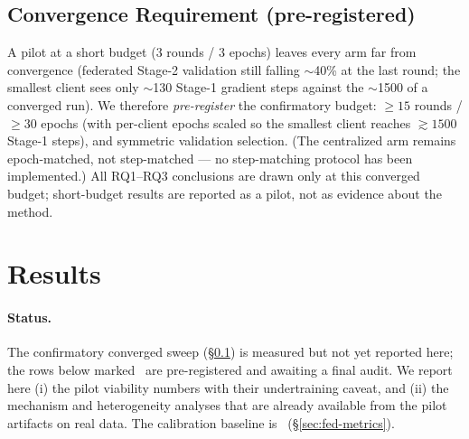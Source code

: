 \subsection{Convergence Requirement (pre-registered)}
\label{sec:fed-convergence}
A pilot at a short budget ($3$ rounds / $3$ epochs) leaves every arm far from convergence
(federated Stage-2 validation still falling $\sim$40\% at the last round; the smallest
client sees only $\sim$130 Stage-1 gradient steps against the $\sim$1500 of a converged
run). We therefore \emph{pre-register} the confirmatory budget: $\geq 15$ rounds /
$\geq 30$ epochs (with per-client epochs scaled so the smallest client reaches
$\gtrsim 1500$ Stage-1 steps), and symmetric validation selection. (The centralized arm
remains epoch-matched, not step-matched --- no step-matching protocol has been implemented.)
All RQ1--RQ3 conclusions are drawn only at this converged budget; short-budget
results are reported as a pilot, not as evidence about the method.

\section{Results}
\label{sec:fed-results}

\paragraph{Status.} The confirmatory converged sweep (\S\ref{sec:fed-convergence}) is measured
but not yet reported here; the rows below marked \pending\ are pre-registered and awaiting a
final audit. We report here (i) the pilot viability numbers with their undertraining caveat,
and (ii) the mechanism and heterogeneity analyses that are already available from the pilot
artifacts on real data. The calibration baseline is \pending\ (\S\ref{sec:fed-metrics}).

